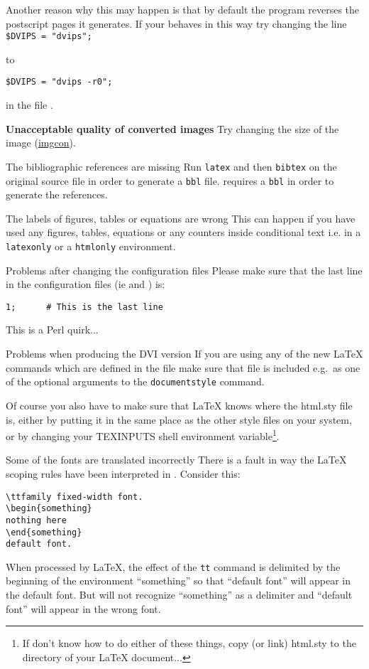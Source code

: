 \begin{htmllist}
Another reason why this may happen is that by default the  program
reverses the postscript pages it generates. If your 
behaves in this way try changing the line
\verb|$DVIPS = "dvips";| 

to

\verb|$DVIPS = "dvips -r0";|

in the file .

\item [\textbf{Unacceptable quality of converted images}]
Try changing the size of the image 
(\hyperref{See image conversion}{See Section }{}{imgcon}).

\item [The bibliographic references are missing]
Run \texttt{latex} and then \texttt{bibtex} on the original source file in
order to generate a \texttt{bbl} file. \latextohtml{} requires a \texttt{bbl}
in order to generate the references.

\item [The labels of figures, tables or equations are wrong]
This can happen if you have used any figures, tables, equations or
any counters inside conditional text i.e. in a \texttt{latexonly} 
or a \texttt{htmlonly} environment. 

\item [Problems after changing the configuration files]
Please make sure that the last line in the configuration files 
(ie  and ) is:
\begin{verbatim}
1;      # This is the last line
\end{verbatim}
This is a Perl quirk...

\item [Problems when producing the DVI version \label{htmlsty}]
If you are using any of the new LaTeX commands which are defined in 
the  file make sure that 
 file is included e.g.\ as one of the optional arguments to the 
\texttt{documentstyle} command.

Of course you also have to make sure that LaTeX knows where the html.sty
file is, either by putting it in the same place as the other style files on
your system, or by changing your TEXINPUTS shell environment variable\footnote{
If don't know how to do either of these things, copy (or link) html.sty 
to the directory of your LaTeX document...}.

\item [Some of the fonts are translated incorrectly]
There is a fault in way the LaTeX scoping rules have been 
interpreted in \latextohtml. Consider this:
\begin{verbatim}
\ttfamily fixed-width font.
\begin{something}
nothing here
\end{something}
default font.
\end{verbatim}
When processed by \LaTeX, the effect of the \texttt{tt} command is
delimited
by the beginning of the environment ``something'' so that ``default font'' will
appear in the default font. But \latextohtml{} will not recognize
``something'' as a delimiter and ``default font'' will appear in the
wrong
font. 


\end{htmllist}
